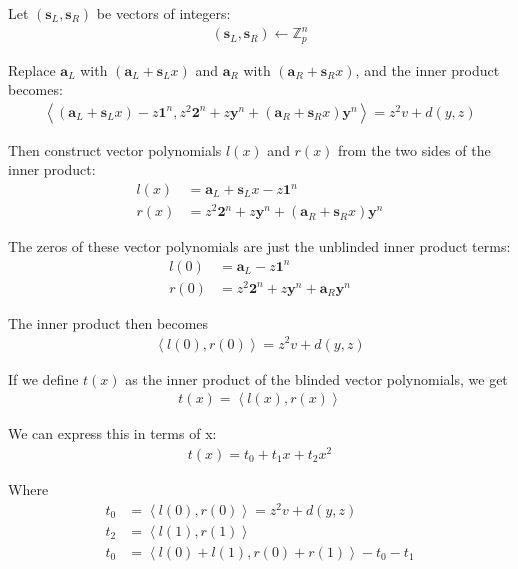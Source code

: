 \documentclass{article}
\begin{document}
Let $(\textbf{s}_L, \textbf{s}_R)$ be vectors of integers:
\begin{align}
  (\textbf{s}_L, \textbf{s}_R) \leftarrow \mathbb{Z}_p^n
\end{align}

Replace $\textbf{a}_L$ with $(\textbf{a}_L + \textbf{s}_L x)$ and $\textbf{a}_R$ with $(\textbf{a}_R + \textbf{s}_R x)$, and the inner product becomes:
\begin{align}
  \left<(\textbf{a}_L + \textbf{s}_L x) - z \textbf{1}^n, z^2 \textbf{2}^n + z \textbf{y}^n + (\textbf{a}_R+ \textbf{s}_R x)\textbf{y}^n\right> = z^2 v + d(y,z)
\end{align}

Then construct vector polynomials $l(x)$ and $r(x)$ from the two sides of the inner product:
\begin{align}
  l(x) &= \textbf{a}_L + \textbf{s}_L x - z \textbf{1}^n\\
  r(x) &= z^2 \textbf{2}^n + z \textbf{y}^n + (\textbf{a}_R+ \textbf{s}_R x) \textbf{y}^n
\end{align}

The zeros of these vector polynomials are just the unblinded inner product terms:
\begin{align}
  l(0) &= \textbf{a}_L - z \textbf{1}^n\\
  r(0) &= z^2 \textbf{2}^n + z \textbf{y}^n + \textbf{a}_R \textbf{y}^n
\end{align}

The inner product then becomes
\begin{align}
  \left<l(0), r(0)\right> = z^2 v + d(y,z)
\end{align}

If we define $t(x)$ as the inner product of the blinded vector polynomials, we get
\begin{align}
  t(x) = \left<l(x), r(x)\right> 
\end{align}

We can express this in terms of x:
\begin{align}
  t(x) = t_0 + t_1 x + t_2 x^2
\end{align}

Where
\begin{align}
  t_0 &= \left<l(0), r(0)\right> = z^2 v + d(y,z)\\
  t_2 &= \left<l(1), r(1)\right>\\
  t_0 &= \left<l(0) + l(1), r(0) + r(1)\right> - t_0 - t_1
\end{align}
\end{document}
